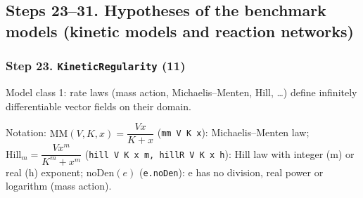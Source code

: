 \subsection*{Steps 23--31. Hypotheses of the benchmark models (kinetic models and reaction networks)}

\subsubsection*{Step 23. \texttt{KineticRegularity} (11)}
Model class 1: rate laws (mass action, Michaelis--Menten, Hill, \dots{}) define infinitely differentiable vector fields on their domain.

{\small\raggedright Notation: $\mathrm{MM}(V,K,x)=\dfrac{Vx}{K+x}$ (\texttt{mm V K x}): Michaelis--Menten law; $\mathrm{Hill}_m=\dfrac{Vx^m}{K^m+x^m}$ (\texttt{hill V K x m, hillR V K x h}): Hill law with integer (m) or real (h) exponent; $\mathrm{noDen}(e)$ (\texttt{e.noDen}): e has no division, real power or logarithm (mass action).}

